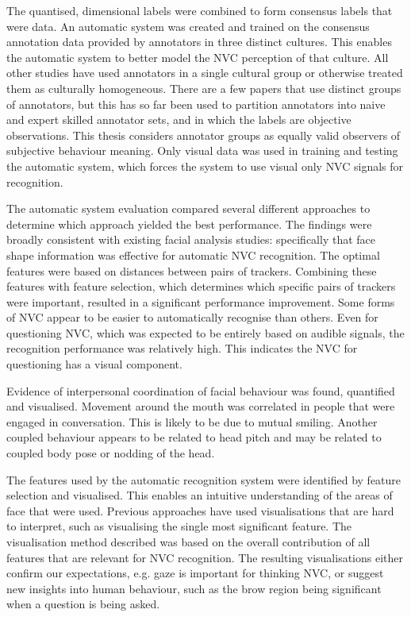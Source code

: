The quantised, dimensional labels were combined to form consensus labels that were \continuous data. An automatic system was created and trained on the consensus annotation data provided by annotators in three distinct cultures. This enables the automatic system to better model the \ac{NVC} perception of that culture. All other studies have used annotators in a single cultural group or otherwise treated them as culturally homogeneous.
There are a few papers that use distinct groups of annotators, but this has so far been used to partition annotators into naive and expert skilled annotator sets, and in which the labels are objective observations. This thesis considers annotator groups as equally valid observers of subjective behaviour meaning. Only visual data was used in training and testing the automatic system, which forces the system to use visual only \ac{NVC} signals for recognition.

The automatic system evaluation compared several different approaches to determine which approach yielded the best performance. The findings were broadly consistent with existing facial analysis studies: specifically that face shape information was effective for automatic \ac{NVC} recognition. The optimal features were based on distances between pairs of trackers. Combining these features with feature selection, which determines which specific pairs of trackers were important, resulted in a significant performance improvement. Some forms of \ac{NVC} appear to be easier to automatically recognise than others. Even for questioning \ac{NVC}, which was expected to be entirely based on audible signals, the recognition performance was relatively high. This indicates the \ac{NVC} for questioning has a visual component.

Evidence of interpersonal coordination of facial behaviour was found, quantified and visualised. Movement around the mouth was correlated in people that were engaged in conversation. This is likely to be due to mutual smiling. Another coupled behaviour appears to be related to head pitch and may be related to coupled body pose or nodding of the head. 

The features used by the automatic recognition system were identified by feature selection and visualised. This enables an intuitive understanding of the areas of face that were used. Previous approaches have used visualisations that are hard to interpret, such as visualising the single most significant feature. The visualisation method described was based on the overall contribution of all features that are relevant for \ac{NVC} recognition. 
The resulting visualisations either confirm our expectations, e.g. gaze is important for thinking \ac{NVC}, or suggest new insights into human behaviour, such as the brow region being significant when a question is being asked.


